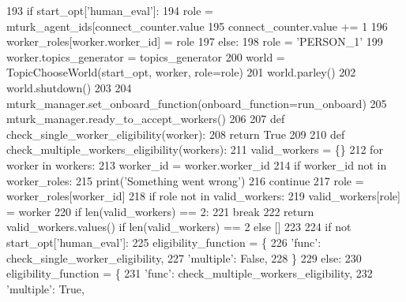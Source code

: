 \begin{DoxyCode}
{{{{193             \textcolor{keywordflow}{if} start\_opt[\textcolor{stringliteral}{'human\_eval'}]:
194                 role = mturk\_agent\_ids[connect\_counter.value %
195                 connect\_counter.value += 1
196                 worker\_roles[worker.worker\_id] = role
197             \textcolor{keywordflow}{else}:
198                 role = \textcolor{stringliteral}{'PERSON\_1'}
199             worker.topics\_generator = topics\_generator
200             world = TopicChooseWorld(start\_opt, worker, role=role)
201             world.parley()
202             world.shutdown()
203 
204         mturk\_manager.set\_onboard\_function(onboard\_function=run\_onboard)
205         mturk\_manager.ready\_to\_accept\_workers()
206 
207         \textcolor{keyword}{def }check\_single\_worker\_eligibility(worker):
208             \textcolor{keywordflow}{return} \textcolor{keyword}{True}
209 
210         \textcolor{keyword}{def }check\_multiple\_workers\_eligibility(workers):
211             valid\_workers = \{\}
212             \textcolor{keywordflow}{for} worker \textcolor{keywordflow}{in} workers:
213                 worker\_id = worker.worker\_id
214                 \textcolor{keywordflow}{if} worker\_id \textcolor{keywordflow}{not} \textcolor{keywordflow}{in} worker\_roles:
215                     print(\textcolor{stringliteral}{'Something went wrong'})
216                     \textcolor{keywordflow}{continue}
217                 role = worker\_roles[worker\_id]
218                 \textcolor{keywordflow}{if} role \textcolor{keywordflow}{not} \textcolor{keywordflow}{in} valid\_workers:
219                     valid\_workers[role] = worker
220                 \textcolor{keywordflow}{if} len(valid\_workers) == 2:
221                     \textcolor{keywordflow}{break}
222             \textcolor{keywordflow}{return} valid\_workers.values() \textcolor{keywordflow}{if} len(valid\_workers) == 2 \textcolor{keywordflow}{else} []
223 
224         \textcolor{keywordflow}{if} \textcolor{keywordflow}{not} start\_opt[\textcolor{stringliteral}{'human\_eval'}]:
225             eligibility\_function = \{
226                 \textcolor{stringliteral}{'func'}: check\_single\_worker\_eligibility,
227                 \textcolor{stringliteral}{'multiple'}: \textcolor{keyword}{False},
228             \}
229         \textcolor{keywordflow}{else}:
230             eligibility\_function = \{
231                 \textcolor{stringliteral}{'func'}: check\_multiple\_workers\_eligibility,
232                 \textcolor{stringliteral}{'multiple'}: \textcolor{keyword}{True},
}}}}
\end{DoxyCode}
